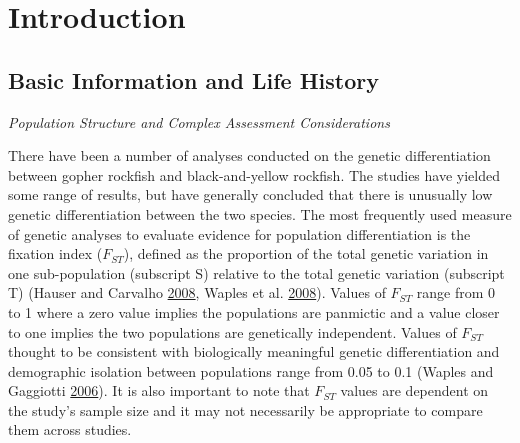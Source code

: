 \documentclass[12pt,]{article}
\begin{document}
\newpage

\renewcommand{\thefigure}{\arabic{figure}}
\renewcommand{\thetable}{\arabic{table}}

\setcounter{figure}{0} \setcounter{table}{0}


\section{Introduction}\label{introduction}

\subsection{Basic Information and Life
History}\label{basic-information-and-life-history}

\emph{Population Structure and Complex Assessment Considerations}

There have been a number of analyses conducted on the genetic
differentiation between gopher rockfish and black-and-yellow rockfish.
The studies have yielded some range of results, but have generally
concluded that there is unusually low genetic differentiation between
the two species. The most frequently used measure of genetic analyses to
evaluate evidence for population differentiation is the fixation index
(\(F_{ST}\)), defined as the proportion of the total genetic variation
in one sub-population (subscript S) relative to the total genetic
variation (subscript T) (Hauser and Carvalho
\protect\hyperlink{ref-Hauser2008}{2008}, Waples et al.
\protect\hyperlink{ref-Waples2008}{2008}). Values of \(F_{ST}\) range
from 0 to 1 where a zero value implies the populations are panmictic and
a value closer to one implies the two populations are genetically
independent. Values of \(F_{ST}\) thought to be consistent with
biologically meaningful genetic differentiation and demographic
isolation between populations range from 0.05 to 0.1 (Waples and
Gaggiotti \protect\hyperlink{ref-Waples2006}{2006}). It is also
important to note that \(F_{ST}\) values are dependent on the study's
sample size and it may not necessarily be appropriate to compare them
across studies.
\end{document}
